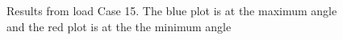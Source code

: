 \begin{figure}[H]
\hfill
{}\hfill
\caption[$\; \:$Results from load Case 15]{Results from load Case 15. The blue plot is at the maximum angle and the red plot is at the the minimum angle}
\label{fig:r15}
\end{figure}